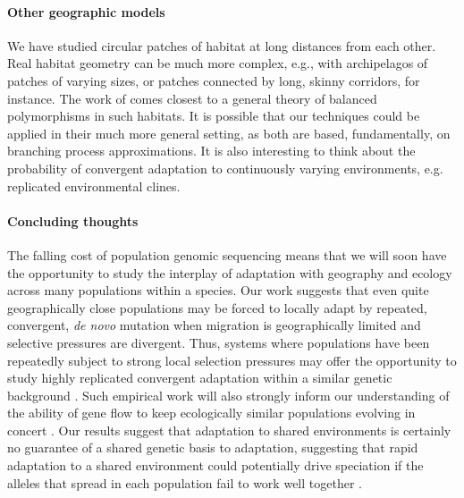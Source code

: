 \documentclass[10pt,letterpaper]{article}
\newcommand{\citep}[1]{\cite{#1}}
\newcommand{\citet}[1]{\cite{#1}}
\begin{document}
\paragraph{Other geographic models}
We have studied circular patches of habitat at long distances from each other.
Real habitat geometry can be much more complex,
e.g., with archipelagos of patches of varying sizes, 
or patches connected by long, skinny corridors, for instance.
The work of \citet{cantrell1991diffusive} comes closest to a general theory of balanced polymorphisms in such habitats.
It is possible that our techniques could be applied in their much more general setting,
as both are based, fundamentally, on branching process approximations.
It is also interesting to think about the probability of convergent
adaptation to continuously varying environments, e.g. replicated
environmental clines.

\paragraph{Concluding thoughts}
The falling cost of population genomic sequencing means that we will soon have the
opportunity to study the interplay of adaptation with geography and ecology 
across many populations within a species. 
Our work suggests that even quite geographically close populations 
may be forced to locally adapt by repeated, convergent, \textit{de novo} mutation 
when migration is geographically limited
and selective pressures are divergent.
Thus, systems where populations have been repeatedly subject to 
strong local selection pressures may offer the opportunity 
to study highly replicated convergent adaptation within a similar
genetic background \citep{stern2013genetic}.  
Such empirical work will also strongly inform our understanding of the
ability of gene flow to keep ecologically similar populations evolving
in concert \citep{sexton2013genetic}.
Our results suggest that adaptation to shared environments is
certainly no guarantee of a shared genetic basis to adaptation, 
suggesting that rapid adaptation to a shared environment could potentially drive
speciation if the alleles that spread in each population fail to work
well together \citep{Kondrashov:03}. 


\end{document}

